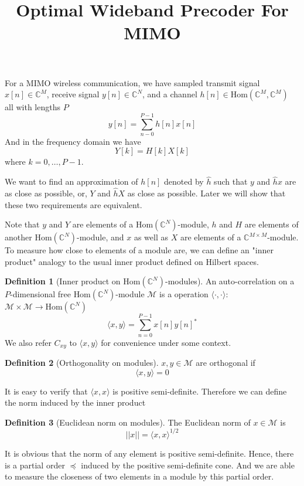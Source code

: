 \documentclass[12pt]{article}
\title{Optimal Wideband Precoder For MIMO}
\theoremstyle{definition}
\newtheorem{definition}{Definition}
\begin{document}
\maketitle
For a MIMO wireless communication, we have sampled transmit signal $x[n]\in\mathbb{C}^M$, receive signal $y[n]\in\mathbb{C}^N$, and a channel $h[n]\in\mbox{Hom}\left(\mathbb{C}^M, \mathbb{C}^M\right)$ all with lengths $P$
$$y[n]=\sum_{n-0}^{P-1}h[n]x[n]$$
And in the frequency domain we have
$$Y[k]=H[k]X[k]$$
where $k=0,\dots,P-1$.

We want to find an approximation of $h[n]$ denoted by $\hat{h}$ such that $y$ and $\hat{h}x$ are as close as possible, or, $Y$ and $\hat{h}X$ as close as possible. Later we will show that these two requirements are equivalent.

Note that $y$ and $Y$ are elements of a $\mbox{Hom}\left(\mathbb{C}^N \right)$-module, $h$ and $H$ are elements of another $\mbox{Hom}\left(\mathbb{C}^N \right)$-module, and $x$ as well as $X$ are elements of a $\mathbb{C}^{M\times M}$-module. To measure how close to elements of a module are, we can define an "inner product" analogy to the usual inner product defined on Hilbert spaces.
\begin{definition}[Inner product on $\mbox{Hom}\left(\mathbb{C}^N \right)$-modules]\label{def inner product}
	An auto-correlation on a $P$-dimensional free $\mbox{Hom}\left(\mathbb{C}^N \right)$-module $\mathcal{M}$ is a operation $\langle\cdot,\cdot\rangle$: $\mathcal{M}\times\mathcal{M}\rightarrow\mbox{Hom}\left(\mathbb{C}^N \right)$
	$$\langle x,y\rangle=\sum_{n=0}^{P-1}x[n]y[n]^*$$
	We also refer $C_{xy}$ to $\langle x,y\rangle$ for convenience under some context.
\end{definition}
\begin{definition}[Orthogonality on modules]\label{def orthogonality}
	$x,y\in\mathcal{M}$ are orthogonal if
	$$\langle x,y\rangle=0$$
\end{definition}
It is easy to verify that $\langle x,x\rangle$ is positive semi-definite. Therefore we can define the norm induced by the inner product
\begin{definition}[Euclidean norm on modules]\label{def norm}
	The Euclidean norm of $x\in\mathcal{M}$ is 
	$$||x||=\langle x,x\rangle^{1/2}$$
\end{definition}
It is obvious that the norm of any element is positive semi-definite. Hence, there is a partial order $\preceq$ induced by the positive semi-definite cone. And we are able to measure the closeness of two elements in a module by this partial order.
\end{document}
